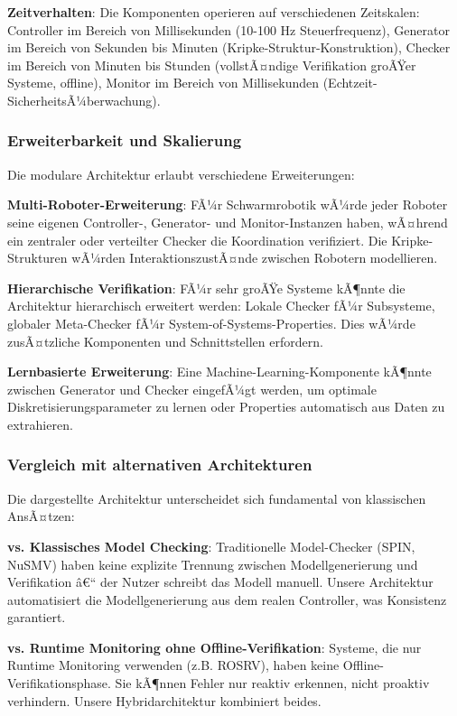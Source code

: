 ﻿\documentclass[a4paper,12pt]{article}
\theoremstyle{definition}
\begin{document}
\textbf{Zeitverhalten}: Die Komponenten operieren auf verschiedenen Zeitskalen: Controller im Bereich von Millisekunden (10-100 Hz Steuerfrequenz), Generator im Bereich von Sekunden bis Minuten (Kripke-Struktur-Konstruktion), Checker im Bereich von Minuten bis Stunden (vollstÃ¤ndige Verifikation groÃŸer Systeme, offline), Monitor im Bereich von Millisekunden (Echtzeit-SicherheitsÃ¼berwachung).

\subsubsection{Erweiterbarkeit und Skalierung}

Die modulare Architektur erlaubt verschiedene Erweiterungen:

\textbf{Multi-Roboter-Erweiterung}: FÃ¼r Schwarmrobotik wÃ¼rde jeder Roboter seine eigenen Controller-, Generator- und Monitor-Instanzen haben, wÃ¤hrend ein zentraler oder verteilter Checker die Koordination verifiziert. Die Kripke-Strukturen wÃ¼rden InteraktionszustÃ¤nde zwischen Robotern modellieren.

\textbf{Hierarchische Verifikation}: FÃ¼r sehr groÃŸe Systeme kÃ¶nnte die Architektur hierarchisch erweitert werden: Lokale Checker fÃ¼r Subsysteme, globaler Meta-Checker fÃ¼r System-of-Systems-Properties. Dies wÃ¼rde zusÃ¤tzliche Komponenten und Schnittstellen erfordern.

\textbf{Lernbasierte Erweiterung}: Eine Machine-Learning-Komponente kÃ¶nnte zwischen Generator und Checker eingefÃ¼gt werden, um optimale Diskretisierungsparameter zu lernen oder Properties automatisch aus Daten zu extrahieren.

\subsubsection{Vergleich mit alternativen Architekturen}

Die dargestellte Architektur unterscheidet sich fundamental von klassischen AnsÃ¤tzen:

\textbf{vs. Klassisches Model Checking}: Traditionelle Model-Checker (SPIN, NuSMV) haben keine explizite Trennung zwischen Modellgenerierung und Verifikation â€“ der Nutzer schreibt das Modell manuell. Unsere Architektur automatisiert die Modellgenerierung aus dem realen Controller, was Konsistenz garantiert.

\textbf{vs. Runtime Monitoring ohne Offline-Verifikation}: Systeme, die nur Runtime Monitoring verwenden (z.B. ROSRV), haben keine Offline-Verifikationsphase. Sie kÃ¶nnen Fehler nur reaktiv erkennen, nicht proaktiv verhindern. Unsere Hybridarchitektur kombiniert beides.
\end{document}
